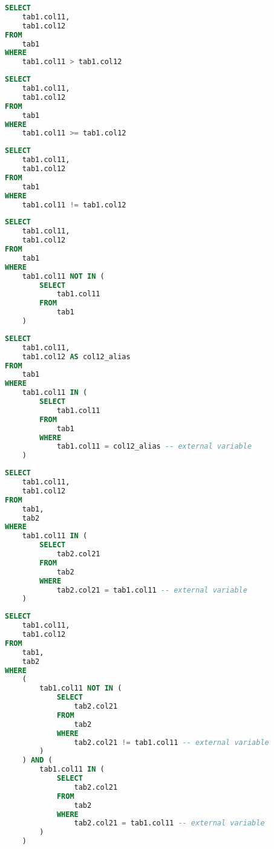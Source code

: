 \documentclass[magisterska,en]{pracamgr}
\begin{document}
\begin{lstlisting}[language=SQL, caption=Query 24]
SELECT
    tab1.col11,
    tab1.col12
FROM
    tab1
WHERE
    tab1.col11 > tab1.col12
\end{lstlisting}

\begin{lstlisting}[language=SQL, caption=Query 25]
SELECT
    tab1.col11,
    tab1.col12
FROM
    tab1
WHERE
    tab1.col11 >= tab1.col12
\end{lstlisting}

\begin{lstlisting}[language=SQL, caption=Query 26]
SELECT
    tab1.col11,
    tab1.col12
FROM
    tab1
WHERE
    tab1.col11 != tab1.col12
\end{lstlisting}

\begin{lstlisting}[language=SQL, caption=Query 27]
SELECT
    tab1.col11,
    tab1.col12
FROM
    tab1
WHERE
    tab1.col11 NOT IN (
        SELECT
            tab1.col11
        FROM
            tab1
    )
\end{lstlisting}

\begin{lstlisting}[language=SQL, caption=Query 28]
SELECT
    tab1.col11,
    tab1.col12 AS col12_alias
FROM
    tab1
WHERE
    tab1.col11 IN (
        SELECT
            tab1.col11
        FROM
            tab1
        WHERE
            tab1.col11 = col12_alias -- external variable
    )
\end{lstlisting}

\begin{lstlisting}[language=SQL, caption=Query 29]
SELECT
    tab1.col11,
    tab1.col12
FROM
    tab1,
    tab2
WHERE
    tab1.col11 IN (
        SELECT
            tab2.col21
        FROM
            tab2
        WHERE
            tab2.col21 = tab1.col11 -- external variable
    )
\end{lstlisting}

\begin{lstlisting}[language=SQL, caption=Query 30]
SELECT
    tab1.col11,
    tab1.col12
FROM
    tab1,
    tab2
WHERE
    (
        tab1.col11 NOT IN (
            SELECT
                tab2.col21
            FROM
                tab2
            WHERE
                tab2.col21 != tab1.col11 -- external variable
        )
    ) AND (
        tab1.col11 IN (
            SELECT
                tab2.col21
            FROM
                tab2
            WHERE
                tab2.col21 = tab1.col11 -- external variable
        )
    )
\end{lstlisting}
\end{document}
